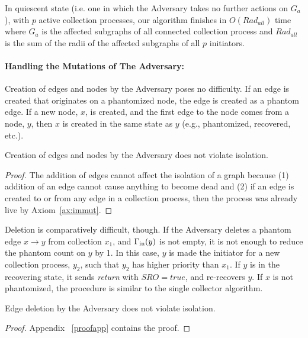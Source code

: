 \begin{corollary}
In quiescent state (i.e. one in which the Adversary takes no further actions on $G_{a}$), with $p$ active collection processes, our algorithm finishes in $O(Rad_{all})$ time where $G_{a}$ is the
affected subgraphs of all connected collection process and
$Rad_{all}$ is the sum of the radii of the affected subgraphs of all $p$ initiators.
\end{corollary}

\paragraph{Handling the Mutations of The Adversary:}
Creation of edges and nodes by the Adversary poses no difficulty. If an edge is
created that originates on a phantomized node, the edge is created as a phantom
edge. If a new node, $x$, is created, and the first edge to the node comes from
a node, $y$, then $x$ is created in the same state as $y$ (e.g., phantomized,
recovered, etc.).

\begin{lemma}
Creation of edges and nodes by the Adversary does not violate isolation.
\label{creationI}
\end{lemma}
\begin{proof}
The addition of edges cannot affect the isolation of a graph because (1) addition
of an edge cannot cause anything to become dead and (2) if an edge is created to
or from any edge in a collection process, then the process was already live by
Axiom~\ref{ax:immut}.
\end{proof}

Deletion is comparatively difficult, though.
If the Adversary deletes a phantom edge $x \rightarrow y$ from collection $x_1$, and $\Gamma_{\rm in}(y)$ is not empty,
it is not enough to reduce
the phantom count on $y$ by 1. In this case, $y$ is made the
initiator for a new collection process, $y_2$, such that $y_2$ has higher priority than $x_1$. If $y$ is in
the recovering state, it sends \emph{return} with $SRO = true$,
and re-recovers $y$.  If $x$ is not phantomized, the
procedure is similar to the single collector algorithm.

\begin{lemma}
Edge deletion by the Adversary does not violate isolation.
\label{deletionI}
\end{lemma}
\begin{proof}
Appendix ~\ref{proofapp} contains the proof.
\end{proof}


